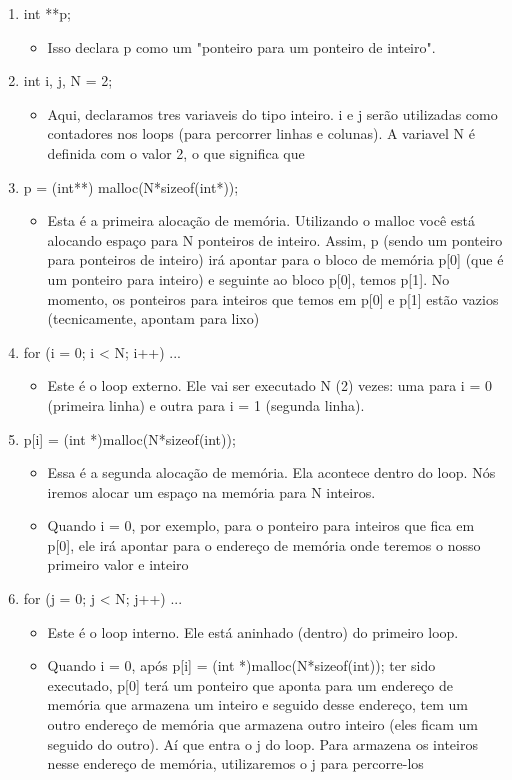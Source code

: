 \documentclass{report}
\begin{document}
	\begin{enumerate}
		\item int **p;
		\begin{itemize}
			\item Isso declara p como um "ponteiro para um ponteiro de inteiro".
		\end{itemize}
		\item int i, j, N = 2;
		\begin{itemize}
			\item Aqui, declaramos tres variaveis do tipo inteiro. i e j serão utilizadas como contadores nos loops (para percorrer linhas e colunas). A variavel N é definida com o valor 2, o que significa que  
		\end{itemize}
		\item p = (int**) malloc(N*sizeof(int*));
		\begin{itemize}
			\item Esta é a primeira alocação de memória. Utilizando o malloc você está alocando espaço para N ponteiros de inteiro. Assim, p (sendo um ponteiro para ponteiros de inteiro) irá apontar para o bloco de memória p[0] (que é um ponteiro para inteiro) e seguinte ao bloco p[0], temos p[1]. No momento, os ponteiros para inteiros que temos em p[0] e p[1] estão vazios (tecnicamente, apontam para lixo)

		\end{itemize}
		
		\item for (i = 0; i < N; i++) { ... }
		\begin{itemize}
			\item Este é o loop externo. Ele vai ser executado N (2) vezes: uma para i = 0 (primeira linha) e outra para i = 1 (segunda linha).
		\end{itemize}
		
		\item p[i] = (int *)malloc(N*sizeof(int));
		\begin{itemize}
			\item Essa é a segunda alocação de memória. Ela acontece dentro do loop. Nós iremos alocar um espaço na memória para N inteiros.
			\item Quando i = 0, por exemplo, para o ponteiro para inteiros que fica em p[0], ele irá apontar para o endereço de memória onde teremos o nosso primeiro valor e inteiro
		\end{itemize}
		\item for (j = 0; j < N; j++) { ... }
		\begin{itemize}
			\item Este é o loop interno. Ele está aninhado (dentro) do primeiro loop.
			\item Quando i = 0, após p[i] = (int *)malloc(N*sizeof(int)); ter sido executado, p[0] terá um ponteiro que aponta para um endereço de memória que armazena um inteiro e seguido desse endereço, tem um outro endereço de memória que armazena outro inteiro (eles ficam um seguido do outro). Aí que entra o j do loop. Para armazena os inteiros nesse endereço de memória, utilizaremos o j para percorre-los 
			

\end{itemize}
\end{enumerate}
\end{document}
